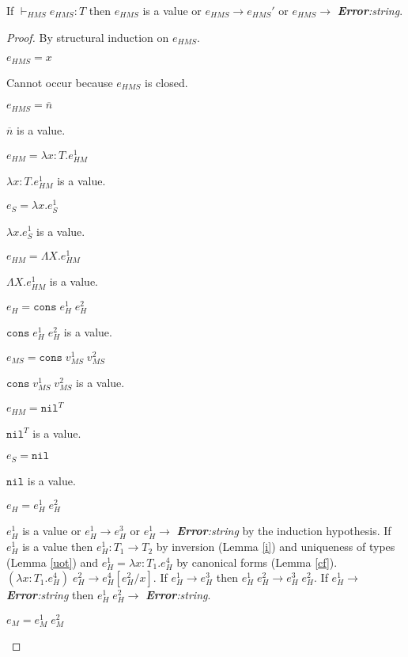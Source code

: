 \begin{theorem}
\label{ps}
\onehalfspacing
If $\vdash_{HMS}e_{HMS}:T$ then $e_{HMS}$ is a value or $e_{HMS}\rightarrow e_{HMS}'$ or $e_{HMS}\rightarrow$ \emph{\textbf{Error}:\;string}.
\begin{proof}
By structural induction on $e_{HMS}$.
\begin{case}
$e_{HMS}=x$

Cannot occur because $e_{HMS}$ is closed.
\end{case}
\begin{case}
$e_{HMS}=\overline{n}$

$\overline{n}$ is a value.
\end{case}
\begin{case}
$e_{HM}=\lambda x:T.e_{HM}^{1}$

$\lambda x:T.e_{HM}^{1}$ is a value.
\end{case}
\begin{case}
$e_{S}=\lambda x.e_{S}^{1}$

$\lambda x.e_{S}^{1}$ is a value.
\end{case}
\begin{case}
$e_{HM}=\Lambda X.e_{HM}^{1}$

$\Lambda X.e_{HM}^{1}$ is a value.
\end{case}
\begin{case}
$e_{H}=\mathtt{cons}\;e_{H}^{1}\;e_{H}^{2}$

$\mathtt{cons}\;e_{H}^{1}\;e_{H}^{2}$ is a value.
\end{case}
\begin{case}
$e_{MS}=\mathtt{cons}\;v_{MS}^{1}\;v_{MS}^{2}$

$\mathtt{cons}\;v_{MS}^{1}\;v_{MS}^{2}$ is a value.
\end{case}
\begin{case}
$e_{HM}=\mathtt{nil}^{T}$

$\mathtt{nil}^{T}$ is a value.
\end{case}
\begin{case}
$e_{S}=\mathtt{nil}$

$\mathtt{nil}$ is a value.
\end{case}
\begin{case}
$e_{H}=e_{H}^{1}\;e_{H}^{2}$

$e_{H}^{1}$ is a value or $e_{H}^{1}\rightarrow e_{H}^{3}$ or $e_{H}^{1}\rightarrow$ \emph{\textbf{Error}:\;string} by the induction hypothesis.  If $e_{H}^{1}$ is a value then $e_{H}^{1}:T_{1}\rightarrow T_{2}$ by inversion (Lemma \ref{i}) and uniqueness of types (Lemma \ref{uot}) and $e_{H}^{1}=\lambda x:T_{1}.e_{H}^{4}$ by canonical forms (Lemma \ref{cf}).  $(\lambda x:T_{1}.e_{H}^{4})\;e_{H}^{2}\rightarrow e_{H}^{4}[e_{H}^{2}/x]$.  If $e_{H}^{1}\rightarrow e_{H}^{3}$ then $e_{H}^{1}\;e_{H}^{2}\rightarrow e_{H}^{3}\;e_{H}^{2}$.  If $e_{H}^{1}\rightarrow$ \emph{\textbf{Error}:\;string} then $e_{H}^{1}\;e_{H}^{2}\rightarrow$ \emph{\textbf{Error}:\;string}.
\end{case}
\begin{case}
$e_{M}=e_{M}^{1}\;e_{M}^{2}$


\end{case}
\end{proof}
\end{theorem}
